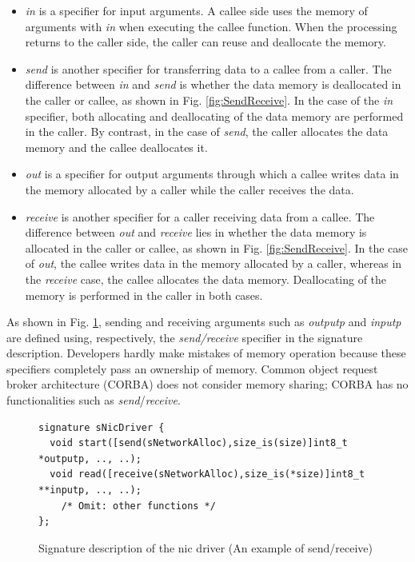 \documentclass[a4j,12pt,oneside,openany,english]{jsbook}
\begin{document}
\begin{itemize}
\item {\it in} is a specifier for input arguments.
A callee side uses the memory of arguments with {\it in} when executing the callee function.
When the processing returns to the caller side, the caller can reuse and deallocate the memory.

\item {\it send} is another specifier for transferring data to a callee from a caller.
The difference between {\it in} and {\it send} is whether the data memory is deallocated in the caller or callee, as shown in Fig. \ref{fig:SendReceive}.
In the case of the {\it in} specifier, both allocating and deallocating of the data memory are performed in the caller.
By contrast, in the case of {\it send}, the caller allocates the data memory and the callee deallocates it.

\item {\it out} is a specifier for output arguments through which a callee writes data in the memory allocated by a caller while the caller receives the data.

\item {\it receive} is another specifier for a caller receiving data from a callee.
The difference between {\it out} and {\it receive} lies in whether the data memory is allocated in the caller or callee, as shown in Fig. \ref{fig:SendReceive}.
In the case of {\it out}, the callee writes data in the memory allocated by a caller, whereas in the {\it receive} case, the callee allocates the data memory.
Deallocating of the memory is performed in the caller in both cases.
\end{itemize}

As shown in Fig. \ref{src:SendReceive}, sending and receiving arguments such as {\it outputp} and {\it inputp} are defined using, respectively, the {\it send/receive} specifier in the signature description.
Developers hardly make mistakes of memory operation because these specifiers completely pass an ownership of memory.
Common object request broker architecture (CORBA) does not consider memory sharing; CORBA has no functionalities
such as {\it send}/{\it receive}.

\begin{figure}[t]
\centering
\begin{lstlisting}
signature sNicDriver {
  void start([send(sNetworkAlloc),size_is(size)]int8_t *outputp, .., ..);
  void read([receive(sNetworkAlloc),size_is(*size)]int8_t **inputp, .., ..);
    /* Omit: other functions */
};
\end{lstlisting}
\caption{Signature description of the nic driver (An example of send/receive)}
\label{src:SendReceive}
\end{figure}
\end{document}
